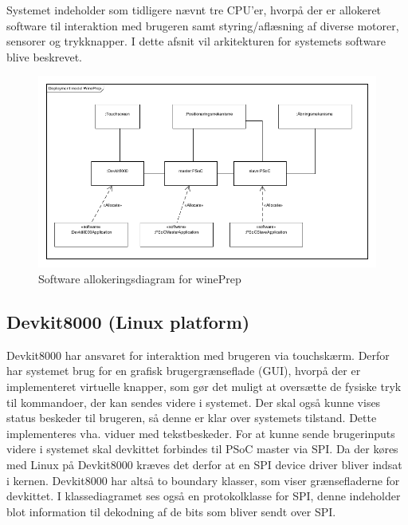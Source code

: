 Systemet indeholder som tidligere nævnt tre CPU'er, hvorpå der er allokeret software til interaktion med brugeren samt styring/aflæsning af diverse 
motorer, sensorer og trykknapper. I dette afsnit vil arkitekturen for systemets software blive beskrevet. \\

\begin{figure}[H]
\includegraphics[scale=0.4]{tex/Arkitektur/Fotos/SW/Allokeringsdiagram}
\caption{Software allokeringsdiagram for winePrep}
\end{figure}  

\subsection{Devkit8000 (Linux platform)}

Devkit8000 har ansvaret for interaktion med brugeren via touchskærm. Derfor har systemet brug for en grafisk brugergrænseflade (GUI), hvorpå der er
implementeret virtuelle knapper, som gør det muligt at oversætte de fysiske tryk til kommandoer, der kan sendes videre i systemet. Der skal også kunne vises
status beskeder til brugeren, så denne er klar over systemets tilstand. Dette implementeres vha. viduer med tekstbeskeder. For at kunne sende brugerinputs 
videre i systemet skal devkittet forbindes til PSoC master via SPI. Da der køres med Linux på Devkit8000 kræves det derfor at en SPI device driver bliver
indsat i kernen. Devkit8000 har altså to boundary klasser, som viser grænsefladerne for devkittet. I klassediagramet ses også en protokolklasse for SPI, denne 
indeholder blot information til dekodning af de bits som bliver sendt over SPI.\\

